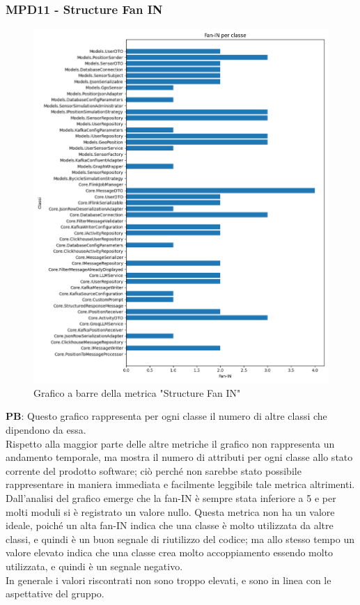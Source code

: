 \documentclass[10pt]{article}
\begin{document}
\begin{justify}
\subsubsection{MPD11 - Structure Fan IN}

\begin{figure}[H]
  \centering
  \includegraphics[width=0.9\linewidth]{metrics_fan_in.png}
  \caption{Grafico a barre della metrica "Structure Fan IN"}
\end{figure}

\textbf{PB}: Questo grafico rappresenta per ogni classe il numero di altre classi che dipendono da essa.\\
Rispetto alla maggior parte delle altre metriche il grafico non rappresenta un andamento temporale, ma mostra il numero di attributi per ogni classe allo stato 
corrente del prodotto software; ciò perché non sarebbe stato possibile rappresentare in maniera immediata e  facilmente leggibile tale metrica altrimenti.\\
Dall'analisi del grafico emerge che la fan-IN è sempre stata inferiore a 5 e per molti moduli si è registrato un valore nullo. Questa metrica non ha un valore ideale,
poiché un alta fan-IN indica che una classe è molto utilizzata da altre classi, e quindi è un buon segnale di riutilizzo del codice; ma allo stesso tempo un valore 
elevato indica che una classe crea molto accoppiamento essendo molto utilizzata, e quindi è un segnale negativo.\\ In generale i valori riscontrati non sono troppo 
elevati, e sono in linea con le aspettative del gruppo.\\



\end{justify}
\end{document}
